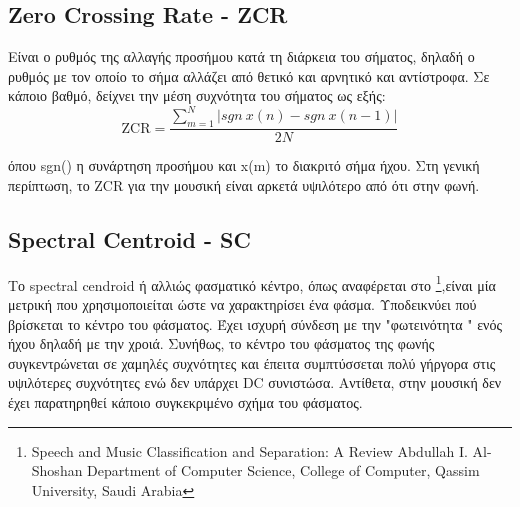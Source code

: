 \subsection{Zero Crossing Rate - ZCR}

Είναι ο ρυθμός της αλλαγής προσήμου κατά τη διάρκεια του σήματος, δηλαδή ο ρυθμός με τον οποίο το σήμα αλλάζει από θετικό και αρνητικό και αντίστροφα. Σε κάποιο βαθμό, δείχνει την μέση συχνότητα του σήματος ως εξής:
\begin{equation}
\text{ZCR} = \frac{\sum_{m=1}^{N} |sgn ~x(n) - sgn~x(n-1)| }{2N}
\end{equation}

όπου sgn() η συνάρτηση προσήμου και x(m) το διακριτό σήμα ήχου. Στη γενική περίπτωση, το ZCR για την μουσική είναι αρκετά υψιλότερο από ότι στην φωνή.


\subsection{Spectral Centroid - SC}

Το spectral cendroid ή αλλιώς φασματικό κέντρο, όπως αναφέρεται στο \footnote{
Speech and Music Classification and Separation: A Review 
Abdullah I. Al-Shoshan
Department of Computer Science, College of Computer, 
Qassim University, Saudi Arabia },είναι μία μετρική που χρησιμοποιείται ώστε να χαρακτηρίσει ένα φάσμα. Υποδεικνύει πού βρίσκεται το κέντρο του φάσματος. Έχει ισχυρή σύνδεση με την "φωτεινότητα " ενός ήχου δηλαδή με την χροιά. Συνήθως, το κέντρο του φάσματος της φωνής συγκεντρώνεται σε χαμηλές συχνότητες και έπειτα συμπτύσσεται πολύ γήργορα στις υψιλότερες συχνότητες ενώ δεν υπάρχει DC συνιστώσα. Αντίθετα, στην μουσική δεν έχει παρατηρηθεί κάποιο συγκεκριμένο σχήμα του φάσματος. 
